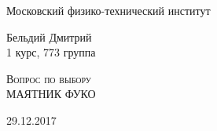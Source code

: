 \documentclass[11pt]{article}
\begin{document}
	\begin{titlepage}
		\begin{center}
					
			\large Московский физико-технический институт
			\vspace{0.25cm}
			
			\large Бельдий Дмитрий\\
			1 курс, 773 группа
			\vfill
			
			\textsc{\LARGE Вопрос по выбору}\\[10mm]
			
			{\Huge МАЯТНИК ФУКО}
			\bigskip
			
			
		\end{center}
		
		\vfill
		
		\begin{center}
			29.12.2017
		\end{center}
	\end{titlepage}
\end{document}
